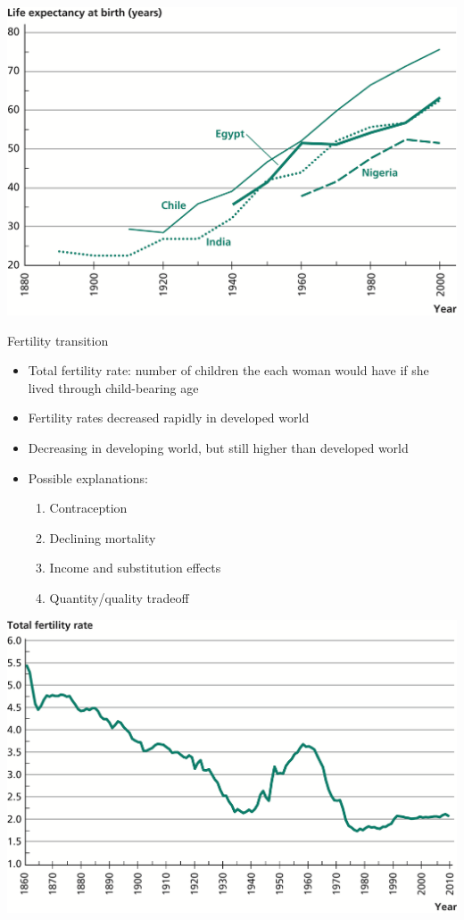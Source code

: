 \documentclass[10pt]{beamer}
\begin{document}
\begin{frame}[label={sec:org3446baa}]{}
\begin{center}
\includegraphics[width=.75\textwidth]{./img/4.9.png}
\end{center}
\end{frame}

\begin{frame}[label={sec:org6c3fe22}]{}
\alert{Fertility transition}
\begin{itemize}
\item Total fertility rate: number of children the each woman would have if she lived through child-bearing age
\item Fertility rates decreased rapidly in developed world
\item Decreasing in developing world, but still higher than developed world
\item Possible explanations:
\begin{enumerate}
\item Contraception
\item Declining mortality
\item Income and substitution effects
\item Quantity/quality tradeoff
\end{enumerate}
\end{itemize}
\end{frame}

\begin{frame}[label={sec:org0191772}]{}
\begin{center}
\includegraphics[width=.75\textwidth]{./img/4.10.png}
\end{center}
\end{frame}
\end{document}
